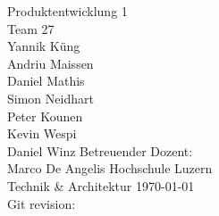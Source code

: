     \begin{titlepage}
        \begin{center}
            \makeatletter
            {\Large Produktentwicklung 1} \\
            \vfill{}
            {\LARGE \@title}
            \vfill{}
            {Team 27 \\
            Yannik Küng \\
            Andriu Maissen \\
            Daniel Mathis \\
            Simon Neidhart \\
            Peter Kounen \\
            Kevin Wespi \\
            Daniel Winz}
            \vfill{}
            {Betreuender Dozent: \\
            Marco De Angelis}
            \vfill{}
            {Hochschule Luzern \\
            Technik \& Architektur}
            \vfill
            {\today \\
            Git revision: 
            }
            \makeatother
        \end{center}
    \end{titlepage}
